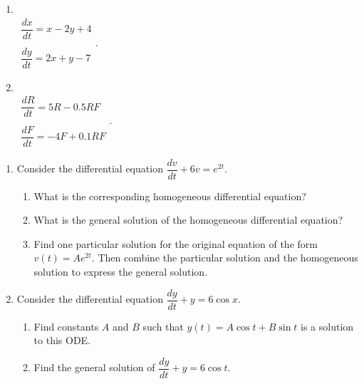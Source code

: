 \documentclass[10pt]{article}
\begin{document}
\begin{multicols}{2}
\begin{enumerate}
\setcounter{enumi}{\theenumCount}
\item ~ \\ $\begin{array}{c} \dfrac{dx}{dt} = x - 2y + 4 \\ ~ \\ \dfrac{dy}{dt} = 2x + y - 7 \end{array}$.


\item ~ \\ $\begin{array}{c} \dfrac{dR}{dt} = 5R - 0.5 RF \\ ~ \\ \dfrac{dF}{dt} = -4F + 0.1RF \end{array}$.

\setcounter{enumCount}{\theenumi}
\end{enumerate} 
\end{multicols}
\vfill


\newpage
\begin{enumerate}
\setcounter{enumi}{\theenumCount}
\item Consider the differential equation $\dfrac{dv}{dt} + 6v = e^{2t}$.  
\begin{enumerate}
\item What is the corresponding homogeneous differential equation? 
\vfill

\item What is the general solution of the homogeneous differential equation?
\vfill

\item Find one particular solution for the original equation of the form $v(t) = Ae^{2t}$. Then combine the particular solution and the homogeneous solution to express the general solution.  
\vfill
\end{enumerate}





\item Consider the differential equation $\dfrac{dy}{dt} + y = 6 \cos x.$
\begin{enumerate}
\item Find constants $A$ and $B$ such that $y(t) = A \cos t + B \sin t$ is a solution to this ODE.
\vfill


\item Find the general solution of $\dfrac{dy}{dt} + y = 6 \cos t$. 
\vfill
\end{enumerate}

\setcounter{enumCount}{\theenumi}
\end{enumerate}
\end{document}
